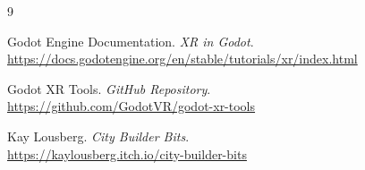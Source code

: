 \documentclass[12pt, a4paper]{article}
\begin{document}
\begin{thebibliography}{9}

Godot Engine Documentation.
\textit{XR in Godot}.\\
\url{https://docs.godotengine.org/en/stable/tutorials/xr/index.html}

Godot XR Tools.
\textit{GitHub Repository}.\\
\url{https://github.com/GodotVR/godot-xr-tools}

Kay Lousberg.
\textit{City Builder Bits}.\\
\url{https://kaylousberg.itch.io/city-builder-bits}

\end{thebibliography}
\end{document}
